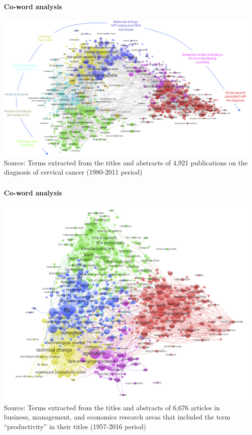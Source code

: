 \documentclass[8pt]{beamer}
\begin{document}

\begin{frame}
\frametitle{\insertsection}
\framesubtitle{Co-word analysis}

\centering
\includegraphics[height=0.75\textheight]{terms_map_cancer}\\
\tiny{Source: Terms extracted from the titles and abstracts of 4,921 publications on the diagnosis of cervical cancer (1980-2011 period)}

\end{frame}

\begin{frame}
\frametitle{\insertsection}
\framesubtitle{Co-word analysis}

\centering
\includegraphics[height=0.75\textheight]{terms_map_productivity}\\
\tiny{Source: Terms extracted from the titles and abstracts of 6,676 articles in business, management, and economics research areas that included the term ``productivity'' in their titles (1957-2016 period)}

\end{frame}
\end{document}
